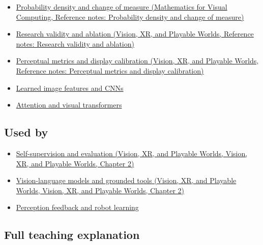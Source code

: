 \begin{itemize}
\tightlist
\item
  \href{../02-Mathematics-for-Visual-Computing/main.pdf\#nameddest=appendix-4815cd87ab8b}{Probability density and change of measure (Mathematics for Visual Computing, Reference notes: Probability density and change of measure)}
\item
  \href{../07-Vision-XR-and-Playable-Worlds/main.pdf\#nameddest=appendix-65788587ef78}{Research validity and ablation (Vision, XR, and Playable Worlds, Reference notes: Research validity and ablation)}
\item
  \href{../07-Vision-XR-and-Playable-Worlds/main.pdf\#nameddest=appendix-b2c1846508bf}{Perceptual metrics and display calibration (Vision, XR, and Playable Worlds, Reference notes: Perceptual metrics and display calibration)}
\item
  \hyperref[appendix-47c51ea026fb]{Learned image features and CNNs}
\item
  \hyperref[appendix-a9d5dfdd164a]{Attention and visual transformers}
\end{itemize}

\subsection{Used by}\label{appendix-772f1fd96148-used-by}

\begin{itemize}
\tightlist
\item
  \href{../07-Vision-XR-and-Playable-Worlds/main.pdf\#nameddest=04-visual-computing-ii-ch031-self-supervision-and-evaluation}{Self-supervision and evaluation (Vision, XR, and Playable Worlds, Vision, XR, and Playable Worlds, Chapter 2)}
\item
  \href{../07-Vision-XR-and-Playable-Worlds/main.pdf\#nameddest=04-visual-computing-ii-ch031-vision-language-models-and-grounded-tools}{Vision-language models and grounded tools (Vision, XR, and Playable Worlds, Vision, XR, and Playable Worlds, Chapter 2)}
\item
  \hyperref[appendix-b0c42da325f1]{Perception feedback and robot learning}
\end{itemize}

\subsection{Full teaching explanation}\label{appendix-772f1fd96148-full-teaching-explanation}

